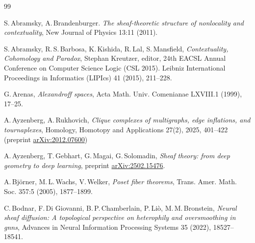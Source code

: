 \documentclass[english,12pt,oneside]{amsproc}
\numberwithin{equation}{section}
\theoremstyle{plain}
\theoremstyle{definition}
\theoremstyle{remark}
\begin{document}
\begin{thebibliography}{99}

S.\,Abramsky, A.\,Brandenburger. \textit{The sheaf-theoretic structure of nonlocality and contextuality}, New Journal of Physics 13:11 (2011).

S.\,Abramsky, R.\,S.\,Barbosa, K.\,Kishida, R.\,Lal, S.\,Mansfield, \textit{Contextuality, Cohomology and Paradox}, Stephan Kreutzer, editor, 24th EACSL Annual Conference on Computer Science Logic (CSL 2015). Leibniz International Proceedings in Informatics (LIPIcs) 41 (2015), 211--228.


G.\,Arenas, \textit{Alexandroff spaces}, Acta Math. Univ. Comenianae LXVIII.1 (1999), 17--25.

A.\,Ayzenberg, A.\,Rukhovich, \textit{Clique complexes of multigraphs, edge inflations, and tournaplexes}, Homology, Homotopy and Applications 27(2), 2025, 401--422 (preprint \href{https://arxiv.org/abs/2012.07600}{arXiv:2012.07600})

A.\,Ayzenberg, T.\,Gebhart, G.\,Magai, G.\,Solomadin, \textit{Sheaf theory: from deep geometry to deep learning}, preprint
\href{https://arxiv.org/abs/2502.15476}{arXiv:2502.15476}.
%
%

A.\,Bj\"{o}rner, M.\,L.\,Wachs, V.\,Welker, \textit{Poset fiber theorems}, Trans. Amer. Math. Soc. 357:5 (2005), 1877–1899.

C.\,Bodnar, F.\,Di Giovanni, B.\,P.\,Chamberlain, P.\,Liò, M.\,M.\,Bronstein, \textit{Neural sheaf diffusion: A topological perspective on heterophily
and oversmoothing in gnns}, Advances in Neural Information Processing Systems 35 (2022), 18527--18541.



\end{thebibliography}
\end{document}
